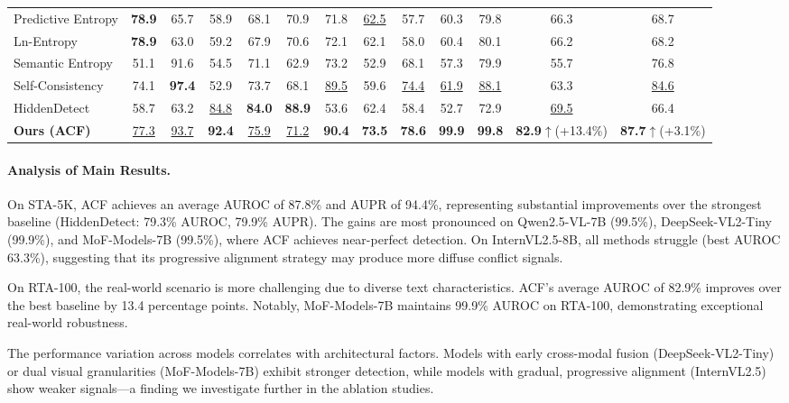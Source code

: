 \documentclass[preprint,12pt]{elsarticle}
\newcommand{\gain}[1]{\textcolor{green!60!black}{\scriptsize$\uparrow$(+#1\%)}}
\begin{document}
\begin{table}[t]
{\begin{tabular}{@{}l cc cc cc cc cc cc@{}}
Predictive Entropy  & \textbf{78.9} & 65.7 & 58.9 & 68.1 & 70.9 & 71.8 & \underline{62.5} & 57.7 & 60.3 & 79.8 & 66.3 &  68.7 \\
Ln-Entropy       & \textbf{78.9} & 63.0 & 59.2 & 67.9 & 70.6 & 72.1 & 62.1 & 58.0 & 60.4 & 80.1 & 66.2 & 68.2  \\
Semantic Entropy & 51.1 & 91.6 & 54.5 & 71.1 & 62.9 & 73.2 & 52.9 & 68.1 & 57.3 & 79.9 & 55.7 & 76.8  \\
Self-Consistency & 74.1 & \textbf{97.4} & 52.9 & 73.7 & 68.1 & \underline{89.5} & 59.6 & \underline{74.4} & \underline{61.9} & \underline{88.1} & 63.3 &  \underline{84.6} \\ 
HiddenDetect & 58.7 & 63.2 & \underline{84.8} & \textbf{84.0} & \textbf{88.9} & 53.6 & 62.4 & 58.4 & 52.7 & 72.9 & \underline{69.5} & 66.4 \\
\rowcolor{gray!20}\textbf{Ours (ACF)}  & \underline{77.3} & \underline{93.7} & \textbf{92.4} & \underline{75.9} & \underline{71.2} & \textbf{90.4} & \textbf{73.5} & \textbf{78.6} & \textbf{99.9} & \textbf{99.8}  & \textbf{82.9}\gain{13.4} & \textbf{87.7}\gain{3.1}\\

\bottomrule

\end{tabular}
}
\end{table}

\paragraph{Analysis of Main Results.}

On STA-5K, ACF achieves an average AUROC of 87.8\% and AUPR of 94.4\%, representing substantial improvements over the strongest baseline (HiddenDetect: 79.3\% AUROC, 79.9\% AUPR). The gains are most pronounced on Qwen2.5-VL-7B (99.5\%), DeepSeek-VL2-Tiny (99.9\%), and MoF-Models-7B (99.5\%), where ACF achieves near-perfect detection. On InternVL2.5-8B, all methods struggle (best AUROC 63.3\%), suggesting that its progressive alignment strategy may produce more diffuse conflict signals.

On RTA-100, the real-world scenario is more challenging due to diverse text characteristics. ACF's average AUROC of 82.9\% improves over the best baseline by 13.4 percentage points. Notably, MoF-Models-7B maintains 99.9\% AUROC on RTA-100, demonstrating exceptional real-world robustness.

The performance variation across models correlates with architectural factors. Models with early cross-modal fusion (DeepSeek-VL2-Tiny) or dual visual granularities (MoF-Models-7B) exhibit stronger detection, while models with gradual, progressive alignment (InternVL2.5) show weaker signals---a finding we investigate further in the ablation studies.
\end{document}
